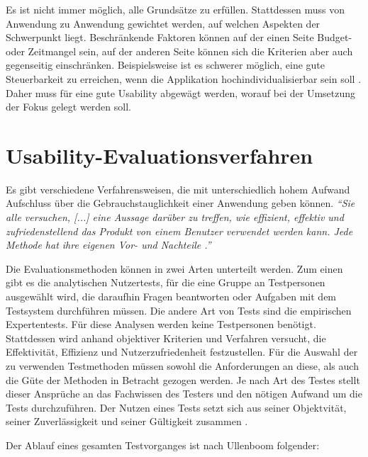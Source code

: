Es ist nicht immer möglich, alle Grundsätze zu erfüllen. Stattdessen muss von Anwendung zu Anwendung gewichtet werden, auf welchen Aspekten der Schwerpunkt liegt. Beschränkende Faktoren können auf der einen Seite Budget- oder Zeitmangel sein, auf der anderen Seite können sich die Kriterien aber auch gegenseitig einschränken. Beispielsweise ist es schwerer möglich, eine gute Steuerbarkeit zu erreichen, wenn die Applikation hochindividualisierbar sein soll \cite{DIN2006}. Daher muss für eine gute Usability abgewägt werden, worauf bei der Umsetzung der Fokus gelegt werden soll.

\section{Usability-Evaluationsverfahren} \label{sec:methods}
Es gibt verschiedene Verfahrensweisen, die mit unterschiedlich hohem Aufwand Aufschluss über die Gebrauchstauglichkeit einer Anwendung geben können. \textit{\enquote{Sie alle versuchen, [...] eine Aussage darüber zu treffen, wie effizient, effektiv und zufriedenstellend das Produkt von einem Benutzer verwendet werden kann. Jede Methode hat ihre eigenen Vor- und Nachteile \cite[S. 224]{Ullenboom2014}.}}\par
Die Evaluationsmethoden können in zwei Arten unterteilt werden. Zum einen gibt es die analytischen Nutzertests, für die eine Gruppe an Testpersonen ausgewählt wird, die daraufhin Fragen beantworten oder Aufgaben mit dem Testsystem durchführen müssen. Die andere Art von Tests sind die empirischen Expertentests. Für diese Analysen werden keine Testpersonen benötigt. Stattdessen wird anhand objektiver Kriterien und Verfahren versucht, die Effektivität, Effizienz und Nutzerzufriedenheit festzustellen. Für die Auswahl der zu verwenden Testmethoden müssen sowohl die Anforderungen an diese, als auch die Güte der Methoden in Betracht gezogen werden. Je nach Art des Testes stellt dieser Ansprüche an das Fachwissen des Testers und den nötigen Aufwand um die Tests durchzuführen. Der Nutzen eines Tests setzt sich aus seiner Objektvität, seiner Zuverlässigkeit und seiner Gültigkeit zusammen \cite[S. 224 f.]{Ullenboom2014}.\par
Der Ablauf eines gesamten Testvorganges ist nach Ullenboom folgender:
